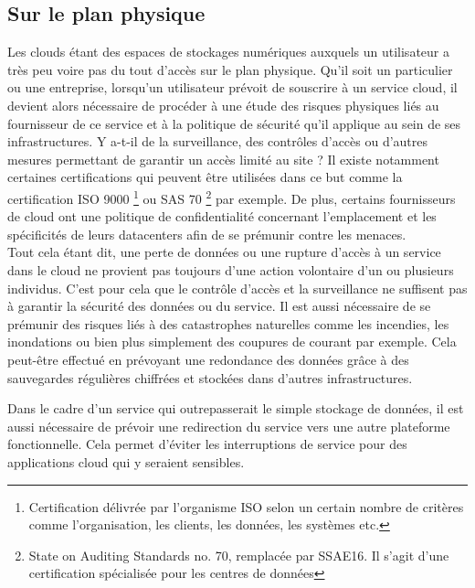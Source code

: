\documentclass[a4paper, 12pt]{article}
\begin{document}
\begin{spacing}{1.1}
    \subsection{Sur le plan physique}
      Les clouds étant des espaces de stockages numériques auxquels un
      utilisateur a très peu voire pas du tout d'accès sur le plan physique.
      Qu'il soit un particulier ou une entreprise, lorsqu'un utilisateur
      prévoit de souscrire à un service cloud, il devient alors nécessaire de
      procéder à une étude des risques physiques liés au fournisseur de
      ce service et à la politique de sécurité qu'il applique au sein de ses
      infrastructures. Y a-t-il de la surveillance, des contrôles d'accès ou
      d'autres mesures permettant de garantir un accès limité au site ? Il
      existe notamment certaines certifications qui peuvent être utilisées dans
      ce but comme la certification ISO 9000 \footnote{Certification délivrée
      par l'organisme ISO selon un certain nombre de critères comme
      l'organisation, les clients, les données, les systèmes etc.} ou SAS 70
      \footnote{State on Auditing Standards no. 70, remplacée par SSAE16. Il
      s'agit d'une certification spécialisée pour les centres de données} par
      exemple. De plus, certains fournisseurs de cloud ont une politique de
      confidentialité concernant l'emplacement et les spécificités de leurs
      datacenters afin de se prémunir contre les menaces. \\

      Tout cela étant dit, une perte de données ou une rupture d'accès à un
      service dans le cloud ne provient pas toujours d'une action volontaire
      d'un ou plusieurs individus. C'est pour cela que le contrôle d'accès et la
      surveillance ne suffisent pas à garantir la sécurité des données ou
      du service. Il est aussi nécessaire de se prémunir des risques liés à des
      catastrophes naturelles comme les incendies, les inondations ou bien plus
      simplement des coupures de courant par exemple. Cela peut-être
      effectué en prévoyant une redondance des données grâce à des sauvegardes
      régulières chiffrées et stockées dans d'autres infrastructures.

      Dans le cadre d'un service qui outrepasserait le simple stockage de
      données, il est aussi nécessaire de prévoir une redirection du service
      vers une autre plateforme fonctionnelle. Cela permet d'éviter les
      interruptions de service pour des applications cloud qui y seraient
      sensibles.


\end{spacing}
\end{document}
